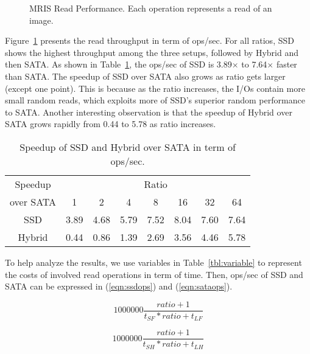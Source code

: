 \begin{figure}[t]
\begin{centering}
\caption{MRIS Read Performance. Each operation represents a read of an
image.}
\label{fig:mrisread}
\end{centering}
\end{figure}

Figure~\ref{fig:mrisread} presents the read throughput in term of
ops/sec. For all ratios, SSD shows the highest throughput among the
three setups, followed by Hybrid and then SATA. As shown in
Table~\ref{tbl:speedup}, the ops/sec of SSD is 3.89$\times$ to
7.64$\times$ faster than SATA. The speedup of SSD over SATA also grows
as ratio gets larger (except one point). This is because as the ratio
increases, the I/Os contain more small random reads, which exploits
more of SSD's superior random performance to SATA. Another interesting
observation is that the speedup of Hybrid over SATA grows rapidly from
0.44 to 5.78 as ratio increases.

\begin{table}[tc]
{\centering \footnotesize
\begin{tabular}{c|c|c|c|c|c|c|c}
\hline 
  Speedup & \multicolumn{7}{c}{Ratio} \\ \cline{2-8}
  over SATA & 1 & 2 & 4 & 8 & 16 & 32 & 64 \\ \hline
  SSD & 3.89 & 4.68 & 5.79 & 7.52 & 8.04 & 7.60 & 7.64  \\
  Hybrid & 0.44 & 0.86 & 1.39 & 2.69 & 3.56 & 4.46 & 5.78 \\ \hline
\end{tabular}
 \caption{Speedup of SSD and Hybrid over SATA in term of ops/sec.}
\label{tbl:speedup}
}
\end{table}

To help analyze the results, we use variables in
Table~\ref{tbl:variable} to represent the costs of involved read
operations in term of time. Then, ops/sec of SSD and SATA can be
expressed in (\ref{eqn:ssdops}) and (\ref{eqn:sataops}). 

\begin{equation}
\label{eqn:ssdops}
    1000000 \frac{ratio + 1}{t_{SF} * ratio + t_{LF}}
\end{equation}

\begin{equation}
\label{eqn:sataops}
    1000000 \frac{ratio + 1}{t_{SH} * ratio + t_{LH}}
\end{equation}

